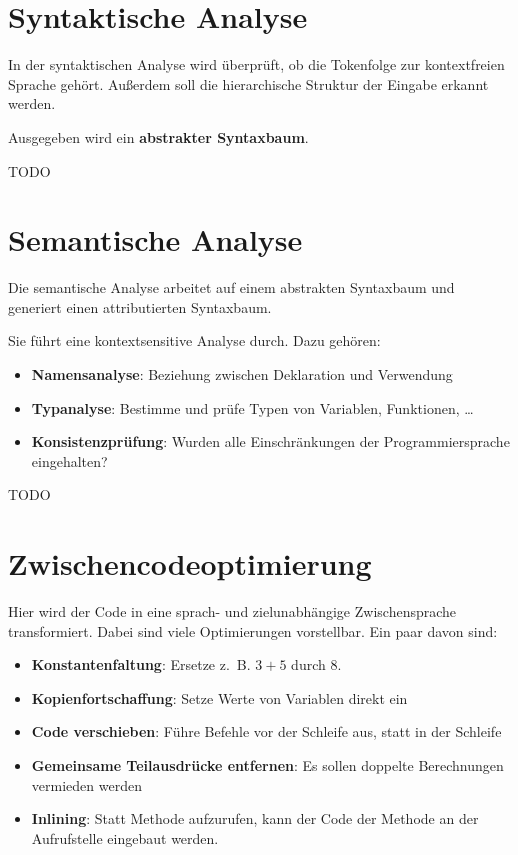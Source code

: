 \begin{beispiel}
\end{beispiel}

\section{Syntaktische Analyse}%
In der syntaktischen Analyse wird überprüft, ob die Tokenfolge zur 
kontextfreien Sprache gehört. Außerdem soll die 
hierarchische Struktur der Eingabe erkannt werden.

Ausgegeben wird ein \textbf{abstrakter Syntaxbaum}.

\begin{beispiel}
	TODO
\end{beispiel}

\section{Semantische Analyse}%
Die semantische Analyse arbeitet auf einem abstrakten Syntaxbaum und generiert
einen attributierten Syntaxbaum.

Sie führt eine kontextsensitive Analyse durch. Dazu gehören:
\begin{itemize}
	\item \textbf{Namensanalyse}: Beziehung zwischen Deklaration und Verwendung
	\item \textbf{Typanalyse}: Bestimme und prüfe Typen von Variablen, Funktionen, \dots {}
	\item \textbf{Konsistenzprüfung}: Wurden alle Einschränkungen der Programmiersprache eingehalten?
\end{itemize}

\begin{beispiel}
    TODO
\end{beispiel}

\section{Zwischencodeoptimierung}
Hier wird der Code in eine sprach- und zielunabhängige Zwischensprache transformiert.
Dabei sind viele Optimierungen vorstellbar. Ein paar davon sind:
\begin{itemize}
    \item \textbf{Konstantenfaltung}: Ersetze z.~B. $3+5$ durch $8$.
    \item \textbf{Kopienfortschaffung}: Setze Werte von Variablen direkt ein
    \item \textbf{Code verschieben}: Führe Befehle vor der Schleife aus, statt in der Schleife 
    \item \textbf{Gemeinsame Teilausdrücke entfernen}: Es sollen doppelte Berechnungen vermieden werden 
    \item \textbf{Inlining}: Statt Methode aufzurufen, kann der Code der Methode an der Aufrufstelle eingebaut werden.
\end{itemize}

